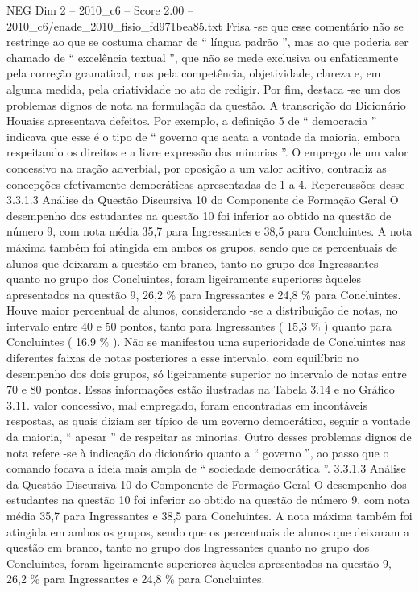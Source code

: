 \begin{textsample}{NEG Dim 2 – 2010\_c6 – Score 2.00 – 2010\_c6/enade\_2010\_fisio\_fd971bea85.txt}
Frisa -se que esse comentário não se restringe ao que se costuma chamar de “ língua padrão ”, mas ao que poderia ser chamado de “ excelência textual ”, que não se mede exclusiva ou enfaticamente pela correção gramatical, mas pela competência, objetividade, clareza e, em alguma medida, pela criatividade no ato de redigir.
Por fim, destaca -se um dos problemas dignos de nota na formulação da questão.
A transcrição do Dicionário Houaiss apresentava defeitos.
Por exemplo, a definição 5 de “ democracia ” indicava que esse é o tipo de “ governo que acata a vontade da maioria, embora respeitando os direitos e a livre expressão das minorias ”.
O emprego de um valor concessivo na oração adverbial, por oposição a um valor aditivo, contradiz as concepções efetivamente democráticas apresentadas de 1 a 4.
Repercussões desse 3.3.1.3 Análise da Questão Discursiva 10 do Componente de Formação Geral O desempenho dos estudantes na questão 10 foi inferior ao obtido na questão de número 9, com nota média 35,7 para Ingressantes e 38,5 para Concluintes.
A nota máxima também foi atingida em ambos os grupos, sendo que os percentuais de alunos que deixaram a questão em branco, tanto no grupo dos Ingressantes quanto no grupo dos Concluintes, foram ligeiramente superiores àqueles apresentados na questão 9, 26,2 \% para Ingressantes e 24,8 \% para Concluintes.
Houve maior percentual de alunos, considerando -se a distribuição de notas, no intervalo entre 40 e 50 pontos, tanto para Ingressantes ( 15,3 \% ) quanto para Concluintes ( 16,9 \% ).
Não se manifestou uma superioridade de Concluintes nas diferentes faixas de notas posteriores a esse intervalo, com equilíbrio no desempenho dos dois grupos, só ligeiramente superior no intervalo de notas entre 70 e 80 pontos.
Essas informações estão ilustradas na Tabela 3.14 e no Gráfico 3.11. valor concessivo, mal empregado, foram encontradas em incontáveis respostas, as quais diziam ser típico de um governo democrático, seguir a vontade da maioria, “ apesar ” de respeitar as minorias.
Outro desses problemas dignos de nota refere -se à indicação do dicionário quanto a “ governo ”, ao passo que o comando focava a ideia mais ampla de “ sociedade democrática ”. 3.3.1.3 Análise da Questão Discursiva 10 do Componente de Formação Geral O desempenho dos estudantes na questão 10 foi inferior ao obtido na questão de número 9, com nota média 35,7 para Ingressantes e 38,5 para Concluintes.
A nota máxima também foi atingida em ambos os grupos, sendo que os percentuais de alunos que deixaram a questão em branco, tanto no grupo dos Ingressantes quanto no grupo dos Concluintes, foram ligeiramente superiores àqueles apresentados na questão 9, 26,2 \% para Ingressantes e 24,8 \% para Concluintes.

\end{textsample}
